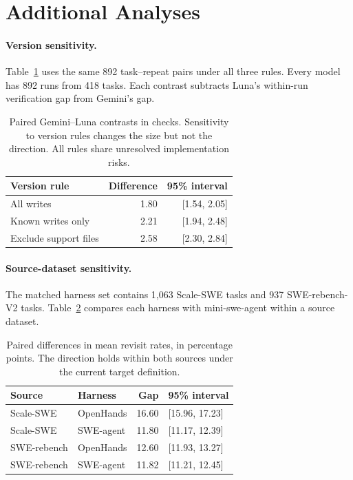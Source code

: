 \documentclass[10pt,a4paper,twocolumn]{article}
\begin{document}
\section{Additional Analyses}\label{app:additional}
\paragraph{Version sensitivity.}
Table~\ref{tab:sensitivity} uses the same 892 task--repeat pairs under all three rules. Every model has 892 runs from 418 tasks. Each contrast subtracts Luna's within-run verification gap from Gemini's gap.
\begin{table}[htbp]
\centering\small
\begin{tabular}{lrr}
\toprule
Version rule & Difference & 95\% interval\\
\midrule
All writes & 1.80 & [1.54, 2.05]\\
Known writes only & 2.21 & [1.94, 2.48]\\
Exclude support files & 2.58 & [2.30, 2.84]\\
\bottomrule
\end{tabular}
\caption{Paired Gemini--Luna contrasts in checks. Sensitivity to version rules changes the size but not the direction. All rules share unresolved implementation risks.}
\label{tab:sensitivity}
\end{table}
\paragraph{Source-dataset sensitivity.}
The matched harness set contains 1,063 Scale-SWE tasks and 937 SWE-rebench-V2 tasks. Table~\ref{tab:source} compares each harness with mini-swe-agent within a source dataset.
\begin{table}[htbp]
\centering\small\setlength{\tabcolsep}{3pt}
\begin{tabular}{llrl}
\toprule
Source & Harness & Gap & 95\% interval\\
\midrule
Scale-SWE & OpenHands & 16.60 & [15.96, 17.23]\\
Scale-SWE & SWE-agent & 11.80 & [11.17, 12.39]\\
SWE-rebench & OpenHands & 12.60 & [11.93, 13.27]\\
SWE-rebench & SWE-agent & 11.82 & [11.21, 12.45]\\
\bottomrule
\end{tabular}
\caption{Paired differences in mean revisit rates, in percentage points. The direction holds within both sources under the current target definition.}
\label{tab:source}
\end{table}
\end{document}
